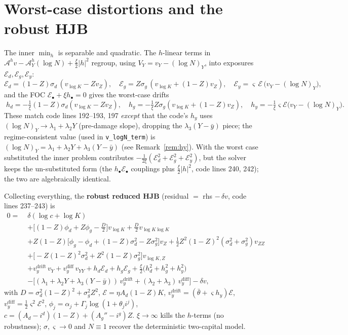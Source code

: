 \documentclass[11pt]{article}
\newcommand{\E}{\mathcal E}
\newcommand{\A}{\mathcal A}
\begin{document}
\section{Worst-case distortions and the robust HJB}

The inner $\min_h$ is separable and quadratic. The $h$-linear terms in
$\A^h v-\A^h_Y(\log N)+\tfrac{\xi}{2}|h|^2$ regroup, using $V_Y=v_Y-(\log N)_Y$, into
exposures $\E_d,\E_g,\E_y$:
\[
\E_d=(1-Z)\sigma_d\,(v_{\log K}-Z v_Z),\quad
\E_g=Z\sigma_g\,(v_{\log K}+(1-Z)v_Z),\quad
\E_y=\varsigma\,\E\,\big(v_Y-(\log N)_Y\big),
\]
and the FOC $\E_\bullet+\xi h_\bullet=0$ gives the worst-case drifts
\[
\boxed{\;
h_d=-\tfrac1\xi(1-Z)\sigma_d(v_{\log K}-Z v_Z),\quad
h_g=-\tfrac1\xi Z\sigma_g(v_{\log K}+(1-Z)v_Z),\quad
h_y=-\tfrac1\xi\varsigma\E\big(v_Y-(\log N)_Y\big).
\;}
\]
These match code lines 192--193, 197 \emph{except} that the code's $h_y$ uses
$(\log N)_Y\to\lambda_1+\lambda_2Y$ (pre-damage slope), dropping the $\lambda_3(Y-\bar y)$ piece;
the regime-consistent value (used in \texttt{v\_logN\_term}) is
$(\log N)_Y=\lambda_1+\lambda_2Y+\lambda_3(Y-\bar y)$ (see Remark~\ref{rem:hy}). With the
worst case substituted the inner problem contributes $-\tfrac1{2\xi}(\E_d^2+\E_g^2+\E_y^2)$,
but the solver keeps the un-substituted form (the $h_\bullet\E_\bullet$ couplings plus
$\tfrac{\xi}{2}|h|^2$, code lines 240, 242); the two are algebraically identical.

Collecting everything, the \textbf{robust reduced HJB} (residual $=$ rhs $-\,\delta v$, code
lines 237--243) is
\[
\boxed{
\begin{aligned}
0=\;&\delta(\log c+\log K)\\
&+\big[(1-Z)\phi_d+Z\phi_g-\tfrac{D}{2}\big]v_{\log K}+\tfrac{D}{2}v_{\log K\log K}\\
&+Z(1-Z)\big[\phi_g-\phi_d+(1-Z)\sigma_d^2-Z\sigma_g^2\big]v_Z
+\tfrac12Z^2(1-Z)^2(\sigma_d^2+\sigma_g^2)v_{ZZ}\\
&+\big[-Z(1-Z)^2\sigma_d^2+Z^2(1-Z)\sigma_g^2\big]v_{\log K,Z}\\
&+v_y^{\text{drift}}\,v_Y+v_y^{\text{diff}}\,v_{YY}
+h_d\E_d+h_g\E_g+\tfrac{\xi}{2}\big(h_d^2+h_g^2+h_y^2\big)\\
&-\Big[(\lambda_1+\lambda_2Y+\lambda_3(Y-\bar y))\,v_y^{\text{drift}}
+(\lambda_2+\lambda_3)\,v_y^{\text{diff}}\Big]-\delta v,
\end{aligned}}
\]
with $D=\sigma_d^2(1-Z)^2+\sigma_g^2Z^2$, $\E=\eta A_d(1-Z)K$,
$v_y^{\text{drift}}=(\bar\theta+\varsigma h_y)\E$, $v_y^{\text{diff}}=\tfrac12\varsigma^2\E^2$,
$\phi_j=\alpha_j+\Gamma_j\log(1+\theta_ji^j)$, $c=(A_d-i^d)(1-Z)+(A_g''-i^g)Z$.
$\xi\to\infty$ kills the $h$-terms (no robustness); $\sigma,\varsigma\to0$ and $N\equiv1$ recover
the deterministic two-capital model.
\end{document}
